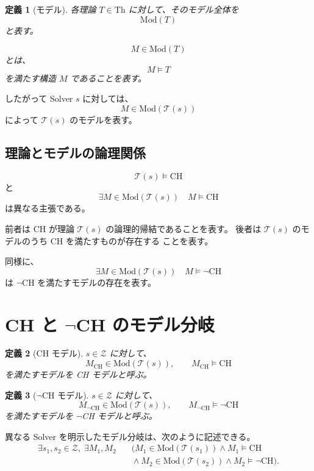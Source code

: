 \documentclass[a4paper,11pt]{jsarticle}
\newtheorem{definition}{定義}[section]
\newcommand{\Th}{\mathrm{Th}}
\newcommand{\Mod}{\mathrm{Mod}}
\begin{document}
\begin{definition}[モデル]
各理論 $T\in\Th$ に対して、そのモデル全体を
\[
\Mod(T)
\]
と表す。

\[
M\in\Mod(T)
\]
とは、
\[
M\models T
\]
を満たす構造 $M$ であることを表す。
\end{definition}

したがって Solver $s$ に対しては、
\[
M\in\Mod(\mathcal{T}(s))
\]
によって $\mathcal{T}(s)$ のモデルを表す。

\subsection{理論とモデルの論理関係}

\[
\mathcal{T}(s)\models\mathrm{CH}
\]
と
\[
\exists M\in\Mod(\mathcal{T}(s))\quad
M\models\mathrm{CH}
\]
は異なる主張である。

前者は CH が理論 $\mathcal{T}(s)$ の論理的帰結であることを表す。
後者は $\mathcal{T}(s)$ のモデルのうち CH を満たすものが存在する
ことを表す。

同様に、
\[
\exists M\in\Mod(\mathcal{T}(s))\quad
M\models\neg\mathrm{CH}
\]
は $\neg\mathrm{CH}$ を満たすモデルの存在を表す。

\section{CH と $\neg$CH のモデル分岐}

\begin{definition}[CH モデル]
$s\in\mathcal{Z}$ に対して、
\[
M_{\mathrm{CH}}\in\Mod(\mathcal{T}(s)),
\qquad
M_{\mathrm{CH}}\models\mathrm{CH}
\]
を満たすモデルを CH モデルと呼ぶ。
\end{definition}

\begin{definition}[$\neg$CH モデル]
$s\in\mathcal{Z}$ に対して、
\[
M_{\neg\mathrm{CH}}\in\Mod(\mathcal{T}(s)),
\qquad
M_{\neg\mathrm{CH}}\models\neg\mathrm{CH}
\]
を満たすモデルを $\neg$CH モデルと呼ぶ。
\end{definition}

異なる Solver を明示したモデル分岐は、次のように記述できる。
\[
\boxed{
\begin{aligned}
\exists s_1,s_2\in\mathcal{Z},\;
\exists M_1,M_2\quad
&
\bigl(
M_1\in\Mod(\mathcal{T}(s_1))
\land M_1\models\mathrm{CH}
\\
&{}\land
M_2\in\Mod(\mathcal{T}(s_2))
\land M_2\models\neg\mathrm{CH}
\bigr).
\end{aligned}}
\]
\end{document}
